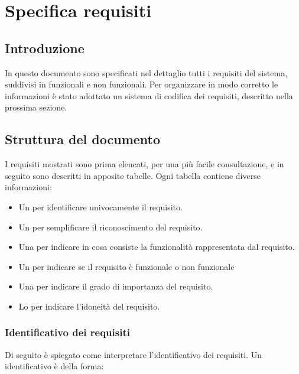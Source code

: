 \chapter{Specifica requisiti} 
\label{cha:specifica_requisiti}

\section{Introduzione} 
In questo documento sono specificati nel dettaglio tutti i requisiti del sistema, suddivisi in funzionali e non funzionali.
Per organizzare in modo corretto le informazioni è stato adottato un sistema di codifica dei requisiti, descritto nella prossima sezione.

\section{Struttura del documento}
\label{sec:struttura_del_documento}

I requisiti mostrati sono prima elencati, per una più facile consultazione, e in seguito sono descritti in apposite tabelle. 
Ogni tabella contiene diverse informazioni:
\begin{itemize}
	\item Un  per identificare univocamente il requisito.
	\item Un  per semplificare il riconoscimento del requisito.
	\item Una  per indicare in cosa consiste la funzionalità rappresentata dal requisito.
	\item Un  per indicare se il requisito è funzionale o non funzionale
	\item Una  per indicare il grado di importanza del requisito.
	\item Lo  per indicare l'idoneità del requisito.
\end{itemize}

\subsection{Identificativo dei requisiti}
\label{subsec:identificativo_dei_requisiti}

Di seguito è spiegato come interpretare l'identificativo dei requisiti.
Un identificativo è della forma:
\begin{center}
\end{center}

